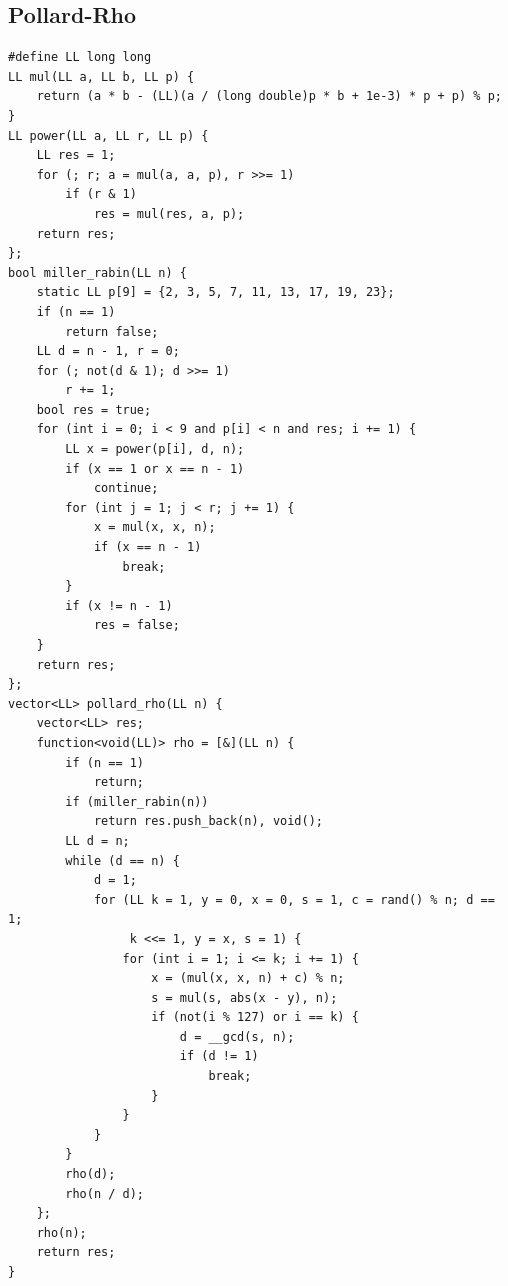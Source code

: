 \documentclass[12pt, a4paper, oneside]{ctexart}
\begin{document}
\subsection{Pollard-Rho} 
\begin{lstlisting}
#define LL long long
LL mul(LL a, LL b, LL p) {
    return (a * b - (LL)(a / (long double)p * b + 1e-3) * p + p) % p;
}
LL power(LL a, LL r, LL p) {
    LL res = 1;
    for (; r; a = mul(a, a, p), r >>= 1)
        if (r & 1)
            res = mul(res, a, p);
    return res;
};
bool miller_rabin(LL n) {
    static LL p[9] = {2, 3, 5, 7, 11, 13, 17, 19, 23};
    if (n == 1)
        return false;
    LL d = n - 1, r = 0;
    for (; not(d & 1); d >>= 1)
        r += 1;
    bool res = true;
    for (int i = 0; i < 9 and p[i] < n and res; i += 1) {
        LL x = power(p[i], d, n);
        if (x == 1 or x == n - 1)
            continue;
        for (int j = 1; j < r; j += 1) {
            x = mul(x, x, n);
            if (x == n - 1)
                break;
        }
        if (x != n - 1)
            res = false;
    }
    return res;
};
vector<LL> pollard_rho(LL n) {
    vector<LL> res;
    function<void(LL)> rho = [&](LL n) {
        if (n == 1)
            return;
        if (miller_rabin(n))
            return res.push_back(n), void();
        LL d = n;
        while (d == n) {
            d = 1;
            for (LL k = 1, y = 0, x = 0, s = 1, c = rand() % n; d == 1;
                 k <<= 1, y = x, s = 1) {
                for (int i = 1; i <= k; i += 1) {
                    x = (mul(x, x, n) + c) % n;
                    s = mul(s, abs(x - y), n);
                    if (not(i % 127) or i == k) {
                        d = __gcd(s, n);
                        if (d != 1)
                            break;
                    }
                }
            }
        }
        rho(d);
        rho(n / d);
    };
    rho(n);
    return res;
}
\end{lstlisting}

\newpage 
\end{document}
